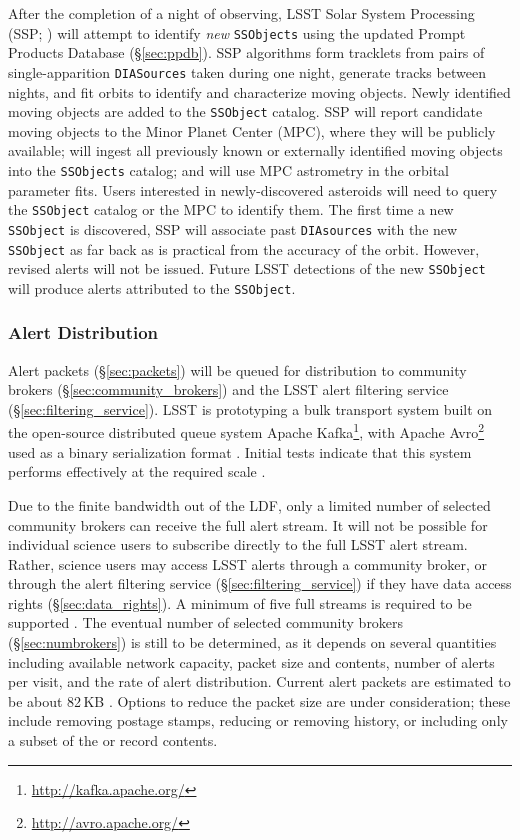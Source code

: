 After the completion of a night of observing,
LSST Solar System Processing (SSP; ) will attempt to identify \textit{new} \texttt{SSObjects} using the updated Prompt Products Database (\S \ref{sec:ppdb}).
SSP algorithms form tracklets from pairs of single-apparition \texttt{DIASources} taken during one night, generate tracks between nights, and fit orbits to identify and characterize moving objects.
Newly identified moving objects are added to the {\tt SSObject} catalog.
SSP will report candidate moving objects to the Minor Planet Center (MPC), where they will be publicly available; will ingest all previously known or externally identified moving objects into the {\tt SSObjects} catalog; and will use MPC astrometry in the orbital parameter fits.
Users interested in newly-discovered asteroids will need to query the \texttt{SSObject} catalog or the MPC to identify them.
The first time a new \texttt{SSObject} is discovered, SSP will associate past \texttt{DIAsources} with the new \texttt{SSObject} as far back as is practical from the accuracy of the orbit.
However, revised alerts will not be issued.
Future LSST detections of the new \texttt{SSObject} will produce alerts attributed to the \texttt{SSObject}.


\subsubsection{Alert Distribution} \label{sec:alert_distribution}

Alert packets (\S \ref{sec:packets}) will be queued for distribution to community brokers (\S \ref{sec:community_brokers}) and the LSST alert filtering service (\S \ref{sec:filtering_service}).
LSST is prototyping  a bulk transport system built on the open-source distributed queue system Apache Kafka\footnote{\url{http://kafka.apache.org/}}, with Apache Avro\footnote{\url{http://avro.apache.org/}} used as a binary serialization format .
Initial tests indicate that this system performs effectively at the required scale .


Due to the finite bandwidth out of the LDF, only a limited number of selected community brokers can receive the full alert stream.
It will not be possible for individual science users to subscribe directly to the full LSST alert stream.
Rather, science users may access LSST alerts through a community broker, or through the alert filtering service (\S \ref{sec:filtering_service}) if they have data access rights (\S \ref{sec:data_rights}).
A minimum of five full streams is required to be supported .
The eventual number of selected community brokers (\S \ref{sec:numbrokers}) is still to be determined, as it depends on several quantities including available network capacity, packet size and contents, number of alerts per visit, and the rate of alert distribution.
Current alert packets are estimated to be about 82\,KB .
Options to reduce the packet size are under consideration; these include removing postage stamps, reducing or removing history, or including only a subset of the \DIASource or \DIAObject record contents.


